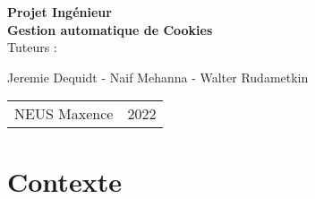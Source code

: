 \documentclass{beamer}
\begin{document}
	
	\begin{frame}
		\centering
		\vspace{4em}
		\textbf{Projet Ingénieur}\\
		\vspace{2em}
		\textbf{\LARGE Gestion automatique de Cookies}\\
		\vspace{3em}
		\vfill
		\tiny Tuteurs :
		
		Jeremie Dequidt - Naif Mehanna - Walter Rudametkin
		
		\vspace{2em}
		
		\begin{tabular}{m{} p{}}
			NEUS Maxence & \hspace{\fill}2022
		\end{tabular}
	\end{frame}

	\begin{frame}
		\tableofcontents
	\end{frame}
	
	\section{Contexte}
	
	
	\begin{frame}
	
	\end{frame}

	
\end{document}
